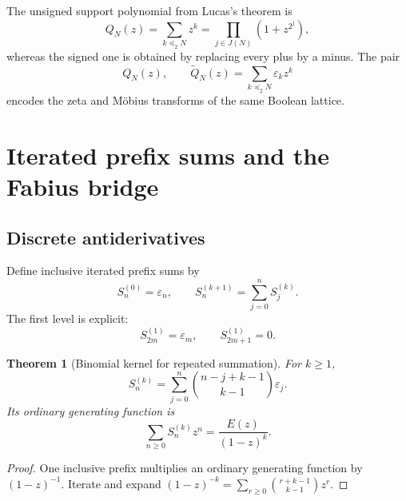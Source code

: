 \documentclass[11pt,oneside]{article}
\newtheorem{theorem}{Theorem}[section]
\theoremstyle{definition}
\theoremstyle{remark}
\newcommand{\eps}{\varepsilon}
\newcommand{\submask}{\preccurlyeq_2}
\begin{document}
The unsigned support polynomial from Lucas's theorem is
\begin{equation}\label{eq:unsigned-support}
 Q_N(z)=\sum_{k\submask N}z^k
       =\prod_{j\in J(N)}(1+z^{2^j}),
\end{equation}
whereas the signed one is obtained by replacing every plus by a minus.  The
pair
\begin{equation}\label{eq:unsigned-signed-pair}
 Q_N(z),\qquad \widetilde Q_N(z)=\sum_{k\submask N}\eps_kz^k
\end{equation}
encodes the zeta and Möbius transforms of the same Boolean lattice.

\section{Iterated prefix sums and the Fabius bridge}

\subsection{Discrete antiderivatives}

Define inclusive iterated prefix sums by
\begin{equation}\label{eq:iterated-prefix-definition}
 S_n^{(0)}=\eps_n,
 \qquad
 S_n^{(k+1)}=\sum_{j=0}^{n}S_j^{(k)}.
\end{equation}
The first level is explicit:
\begin{equation}\label{eq:first-inclusive-prefix}
 S_{2m}^{(1)}=\eps_m,
 \qquad
 S_{2m+1}^{(1)}=0.
\end{equation}

\begin{theorem}[Binomial kernel for repeated summation]\label{thm:iterated-prefix}
For $k\ge1$,
\begin{equation}\label{eq:iterated-prefix-binomial}
 \boxed{\quad
 S_n^{(k)}=\sum_{j=0}^{n}
  \binom{n-j+k-1}{k-1}\eps_j.
 \quad}
\end{equation}
Its ordinary generating function is
\begin{equation}\label{eq:iterated-prefix-generating}
 \boxed{\qquad
 \sum_{n\ge0}S_n^{(k)}z^n=\frac{E(z)}{(1-z)^k}.
 \qquad}
\end{equation}
\end{theorem}

\begin{proof}
One inclusive prefix multiplies an ordinary generating function by
$(1-z)^{-1}$.  Iterate and expand
$(1-z)^{-k}=\sum_{r\ge0}\binom{r+k-1}{k-1}z^r$.
\end{proof}
\end{document}
